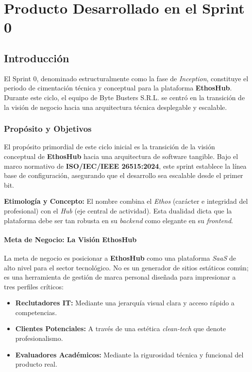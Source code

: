 \chapter{Producto Desarrollado en el Sprint 0}

\newpage
\section{Introducción}
\label{sec:intro}
El Sprint 0, denominado estructuralmente como la fase de \textit{Inception}, constituye el periodo de cimentación técnica y conceptual para la plataforma \textbf{EthosHub}. Durante este ciclo, el equipo de Byte Busters S.R.L. se centró en la transición de la visión de negocio hacia una arquitectura técnica desplegable y escalable.

\subsection{Propósito y Objetivos}
El propósito primordial de este ciclo inicial es la transición de la visión conceptual de \textbf{EthosHub} hacia una arquitectura de software tangible. Bajo el marco normativo de \textbf{ISO/IEC/IEEE 26515:2024}, este sprint establece la línea base de configuración, asegurando que el desarrollo sea escalable desde el primer bit.\par
\textbf{Etimología y Concepto:} El nombre combina el \textit{Ethos} (carácter e integridad del profesional) con el \textit{Hub} (eje central de actividad). Esta dualidad dicta que la plataforma debe ser tan robusta en su \textit{backend} como elegante en su \textit{frontend}.

\subsubsection{Meta de Negocio: La Visión EthosHub}
La meta de negocio es posicionar a \textbf{EthosHub} como una plataforma \textit{SaaS} de alto nivel para el sector tecnológico. No es un generador de sitios estáticos común; es una herramienta de gestión de marca personal diseñada para impresionar a tres perfiles críticos:
\begin{itemize}[noitemsep]
    \item \textbf{Reclutadores IT:} Mediante una jerarquía visual clara y acceso rápido a competencias.
    \item \textbf{Clientes Potenciales:} A través de una estética \textit{clean-tech} que denote profesionalismo.
    \item \textbf{Evaluadores Académicos:} Mediante la rigurosidad técnica y funcional del producto real.
\end{itemize}

